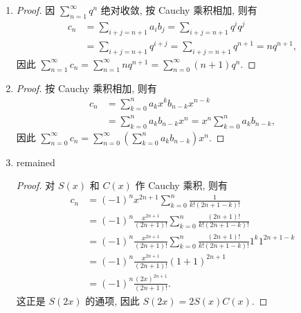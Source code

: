 % 
\begin{enumerate}
    \item %
        \begin{proof}
            因 $\sum\limits_{n=1}^\infty{q^n}$ 绝对收敛, 按 Cauchy 乘积相加, 则有
            \begin{align*}
                c_n &= \sum_{i+j=n+1}a_ib_j = \sum_{i+j=n+1}q^iq^j \\
                &= \sum_{i+j=n+1}q^{i+j} = \sum_{i+j=n+1}q^{n+1} = nq^{n+1},
            \end{align*}
            因此 $\sum\limits_{n=1}^\infty{c_n} = \sum\limits_{n=1}^\infty{nq^{n+1}} = \sum\limits_{n=0}^\infty{(n+1)q^n}$.
        \end{proof}
    \item %
        \begin{proof}
            按 Cauchy 乘积相加, 则有
            \begin{align*}
                c_n &= \sum_{k=0}^na_kx^{k}b_{n-k}x^{n-k} \\
                &= \sum_{k=0}^na_kb_{n-k}x^n = x^n\sum_{k=0}^na_kb_{n-k},
            \end{align*}
            因此 $\sum\limits_{n=0}^\infty{c_n} = \sum\limits_{n=0}^\infty\left(\sum\limits_{k=0}^na_kb_{n-k}\right)x^n$.
        \end{proof}
    \item %
        {\color{red}remained}
        \begin{proof}
            对 $S(x)$ 和 $C(x)$ 作 Cauchy 乘积, 则有
            \begin{align*}
                c_n &= (-1)^nx^{2n+1}\sum_{k=0}^n\frac{1}{k!(2n+1-k)!} \\
                &= (-1)^n\frac{x^{2n+1}}{(2n+1)!}\sum_{k=0}^n\frac{(2n+1)!}{k!(2n+1-k)!} \\
                &= (-1)^n\frac{x^{2n+1}}{(2n+1)!}\sum_{k=0}^n\frac{(2n+1)!}{k!(2n+1-k)!}1^{k}1^{2n+1-k} \\
                &= (-1)^n\frac{x^{2n+1}}{(2n+1)!}(1+1)^{2n+1} \\
                &= (-1)^n\frac{(2x)^{2n+1}}{(2n+1)!}.
            \end{align*}
            这正是 $S(2x)$ 的通项, 因此 $S(2x) = 2S(x)C(x)$.
        \end{proof}
\end{enumerate}
% 
